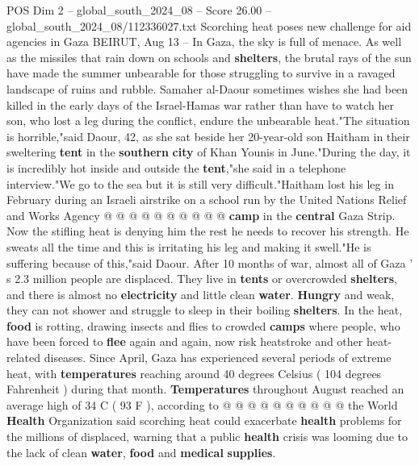\begin{textsample}{POS Dim 2 – global\_south\_2024\_08 – Score 26.00 – global\_south\_2024\_08/112336027.txt}  \label{ex:f2_pos_331}
Scorching heat poses new challenge for aid agencies in Gaza BEIRUT, Aug 13 -- In Gaza, the sky is full of menace.
As well as the missiles that rain down on schools and \textbf{shelters}, the brutal rays of the sun have made the summer unbearable for those struggling to survive in a ravaged landscape of ruins and rubble.
Samaher al-Daour sometimes wishes she had been killed in the early days of the Israel-Hamas war rather than have to watch her son, who lost a leg during the conflict, endure the unbearable heat."The situation is horrible,"said Daour, 42, as she sat beside her 20-year-old son Haitham in their sweltering \textbf{tent} in the \textbf{southern} \textbf{city} of Khan Younis in June."During the day, it is incredibly hot inside and outside the \textbf{tent},"she said in a telephone interview."We go to the sea but it is still very difficult."Haitham lost his leg in February during an Israeli airstrike on a school run by the United Nations Relief and Works Agency @ @ @ @ @ @ @ @ @ @ \textbf{camp} in the \textbf{central} Gaza Strip.
Now the stifling heat is denying him the rest he needs to recover his strength.
He sweats all the time and this is irritating his leg and making it swell."He is suffering because of this,"said Daour.
After 10 months of war, almost all of Gaza ' s 2.3 million people are displaced.
They live in \textbf{tents} or overcrowded \textbf{shelters}, and there is almost no \textbf{electricity} and little clean \textbf{water}. \textbf{Hungry} and weak, they can not shower and struggle to sleep in their boiling \textbf{shelters}.
In the heat, \textbf{food} is rotting, drawing insects and flies to crowded \textbf{camps} where people, who have been forced to \textbf{flee} again and again, now risk heatstroke and other heat-related diseases.
Since April, Gaza has experienced several periods of extreme heat, with \textbf{temperatures} reaching around 40 degrees Celsius ( 104 degrees Fahrenheit ) during that month. \textbf{Temperatures} throughout August reached an average high of 34 C ( 93 F ), according to @ @ @ @ @ @ @ @ @ @ the World \textbf{Health} Organization said scorching heat could exacerbate \textbf{health} problems for the millions of displaced, warning that a public \textbf{health} crisis was looming due to the lack of clean \textbf{water}, \textbf{food} and \textbf{medical} \textbf{supplies}.

\end{textsample}
